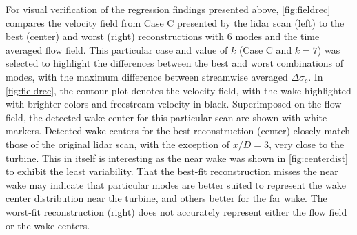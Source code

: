 \documentclass[aip,amsmath,amssymb,preprint,]{revtex4-1}
\begin{document}



For visual verification of the regression findings presented above, \cref{fig:fieldrec} compares the velocity field from Case C presented by the lidar scan (left) to the best (center) and worst (right) reconstructions with 6 modes and the time averaged flow field.
This particular case and value of $k$ (Case C and $k=7$) was selected to highlight the differences between the best and worst combinations of modes, with the maximum difference between streamwise averaged $\Delta \sigma_c$.
In \cref{fig:fieldrec}, the contour plot denotes the velocity field, with the wake highlighted with brighter colors and freestream velocity in black.
Superimposed on the flow field, the detected wake center for this particular scan are shown with white markers.
Detected wake centers for the best reconstruction (center) closely match those of the original lidar scan, with the exception of $x/D=3$, very close to the turbine.
This in itself is interesting as the near wake was shown in \cref{fig:centerdist} to exhibit the least variability. 
That the best-fit reconstruction misses the near wake may indicate that particular modes are better suited to represent the wake center distribution near the turbine, and others better for the far wake.
The worst-fit reconstruction (right) does not accurately represent either the flow field or the wake centers. 

\end{document}
